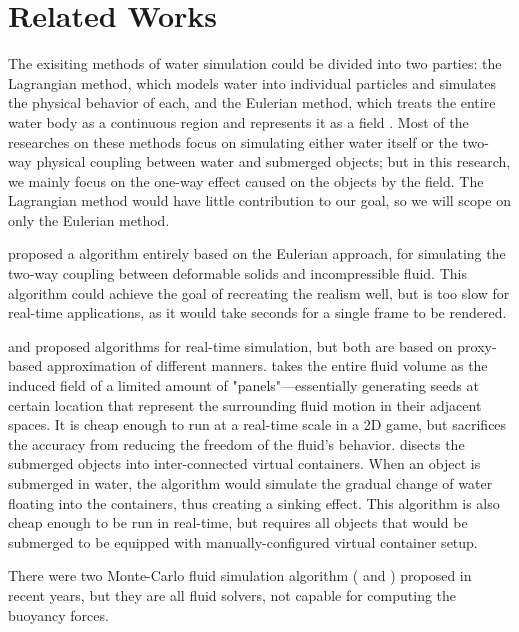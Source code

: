 \section{Related Works}

The exisiting methods of water simulation could be divided into two parties: the Lagrangian method, which models water into individual particles and simulates the physical behavior of each, and the Eulerian method, which treats the entire water body as a continuous region and represents it as a field \cite{GOU09}.
Most of the researches on these methods focus on simulating either water itself or the two-way physical coupling between water and submerged objects;
but in this research, we mainly focus on the one-way effect caused on the objects by the field.
The Lagrangian method would have little contribution to our goal, so we will scope on only the Eulerian method.

\cite{teng2016eulerian} proposed a algorithm entirely based on the Eulerian approach, for simulating the two-way coupling between deformable solids and incompressible fluid.
This algorithm could achieve the goal of recreating the realism well, but is too slow for real-time applications, as it would take seconds for a single frame to be rendered.

\cite{GER13} and \cite{BAJ20} proposed algorithms for real-time simulation, but both are based on proxy-based approximation of different manners.
\cite{GER13} takes the entire fluid volume as the induced field of a
limited amount of "panels"---essentially generating seeds at certain location that represent the surrounding fluid motion in their adjacent spaces.
It is cheap enough to run at a real-time scale in a 2D game, but sacrifices the accuracy from reducing the freedom of the fluid’s behavior.
\cite{BAJ20} disects the submerged objects into inter-connected virtual containers.
When an object is submerged in water, the algorithm would simulate the gradual change of water floating into the containers, thus creating a sinking effect.
This algorithm is also cheap enough to be run in real-time, but requires all objects that would be submerged to be equipped with manually-configured virtual container setup.

There were two Monte-Carlo fluid simulation algorithm (\cite{sugimoto2024velocity} and \cite{rioux2022monte}) proposed in recent years, but they are all fluid solvers, not capable for computing the buoyancy forces.
